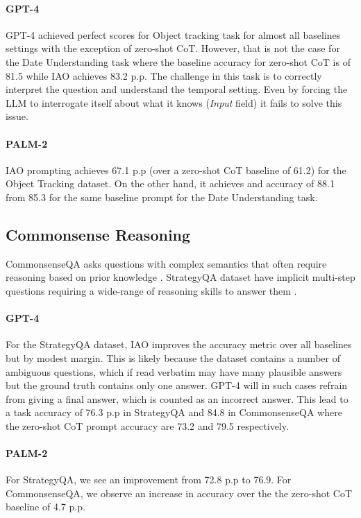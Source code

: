 \paragraph{GPT-4} GPT-4 achieved perfect scores for Object tracking task for almost all baselines settings with the exception of zero-shot CoT. However, that is not the case for the Date Understanding task where the baseline accuracy for zero-shot CoT is of 81.5 while IAO achieves 83.2 p.p. The challenge in this task is to correctly interpret the question and understand the temporal setting. Even by forcing the LLM to interrogate itself about what it knows (\textit{Input} field) it fails to solve this issue.  
\paragraph{PALM-2} IAO prompting achieves 67.1 p.p (over a zero-shot CoT baseline of 61.2) for the Object Tracking dataset. On the other hand, it achieves and accuracy of 88.1 from 85.3 for the same baseline prompt for the Date Understanding task. 

\subsection{Commonsense Reasoning}
CommonsenseQA asks questions with complex semantics that often require reasoning based on prior knowledge \cite{talmor2019commonsenseqa}. StrategyQA  dataset have implicit multi-step questions requiring a wide-range
of reasoning skills to answer them \cite{geva2021did}.
\paragraph{GPT-4} For the StrategyQA dataset, IAO improves the accuracy metric over all baselines but by modest margin. This is likely because the dataset contains a number of ambiguous questions, which if read verbatim may have many plausible answers but the ground truth contains only one answer. GPT-4 will in such cases refrain from giving a final answer, which is counted as an incorrect answer. This lead to a task accuracy of 76.3 p.p in StrategyQA and 84.8 in CommonsenseQA where the zero-shot CoT prompt accuracy are 73.2 and 79.5 respectively.

\paragraph{PALM-2} For StrategyQA, we see an improvement from 72.8 p.p to 76.9. For CommonsenseQA, we observe an increase in accuracy over the the zero-shot CoT baseline of 4.7 p.p.

